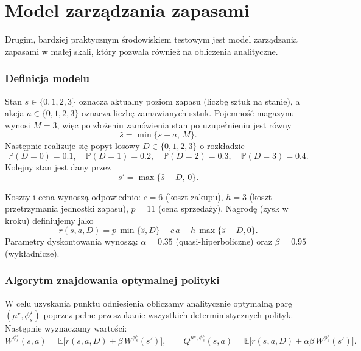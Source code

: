 \section{Model zarządzania zapasami}

Drugim, bardziej praktycznym środowiskiem testowym jest model zarządzania zapasami w małej skali, który pozwala również na obliczenia analityczne. 
\subsubsection{Definicja modelu}

Stan $s \in \{0,1,2,3\}$ oznacza aktualny poziom zapasu (liczbę sztuk na stanie), a akcja $a \in \{0,1,2,3\}$ oznacza liczbę zamawianych sztuk. Pojemność magazynu wynosi $M=3$, więc po złożeniu zamówienia stan po uzupełnieniu jest równy
\[
\hat{s} = \min\{s+a,\, M\}.
\]
Następnie realizuje się popyt losowy $D \in \{0,1,2,3\}$ o rozkładzie
\[
\mathbb{P}(D=0)=0.1,\quad \mathbb{P}(D=1)=0.2,\quad \mathbb{P}(D=2)=0.3,\quad \mathbb{P}(D=3)=0.4.
\]
Kolejny stan jest dany przez
\[
s' = \max\{\hat{s}-D,\,0\}.
\]

Koszty i cena wynoszą odpowiednio: $c=6$ (koszt zakupu), $h=3$ (koszt przetrzymania jednostki zapasu), $p=11$ (cena sprzedaży). Nagrodę (zysk w kroku) definiujemy jako
\[
r(s,a,D)=p\,\min\{\hat{s},D\}-c\,a-h\,\max\{\hat{s}-D,0\}.
\]
Parametry dyskontowania wynoszą: $\alpha=0.35$ (quasi-hiperboliczne) oraz $\beta=0.95$ (wykładnicze).

\subsubsection{Algorytm znajdowania optymalnej polityki}

W celu uzyskania punktu odniesienia obliczamy analitycznie optymalną parę $(\mu^\star,\phi_s^\star)$ poprzez pełne przeszukanie wszystkich deterministycznych polityk. Następnie wyznaczamy wartości:
\[
W^{\phi_s^\star}(s,a)=\mathbb{E}\big[r(s,a,D)+\beta\,W^{\phi_s^\star}(s')\big],
\qquad
Q^{\mu^\star,\phi_s^\star}(s,a)=\mathbb{E}\big[r(s,a,D)+\alpha\beta\,W^{\phi_s^\star}(s')\big].
\]

